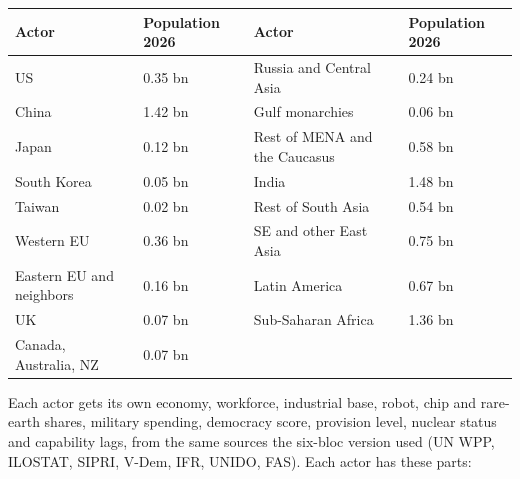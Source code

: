 \documentclass[
  10pt,
]{article}
\newcounter{none} %
\begin{document}
{\def\LTcaptype{none} %
\begin{longtable}[]{@{}llll@{}}
\toprule\noalign{}
Actor & Population 2026 & Actor & Population 2026 \\
\midrule\noalign{}
\endhead
\bottomrule\noalign{}
\endlastfoot
US & 0.35 bn & Russia and Central Asia & 0.24 bn \\
China & 1.42 bn & Gulf monarchies & 0.06 bn \\
Japan & 0.12 bn & Rest of MENA and the Caucasus & 0.58 bn \\
South Korea & 0.05 bn & India & 1.48 bn \\
Taiwan & 0.02 bn & Rest of South Asia & 0.54 bn \\
Western EU & 0.36 bn & SE and other East Asia & 0.75 bn \\
Eastern EU and neighbors & 0.16 bn & Latin America & 0.67 bn \\
UK & 0.07 bn & Sub-Saharan Africa & 1.36 bn \\
Canada, Australia, NZ & 0.07 bn & & \\
\end{longtable}
}

Each actor gets its own economy, workforce, industrial base, robot, chip and rare-earth shares,
military spending, democracy score, provision level, nuclear status and capability lags, from the
same sources the six-bloc version used (UN WPP, ILOSTAT, SIPRI, V-Dem, IFR, UNIDO, FAS). Each actor
has these parts:
\end{document}

